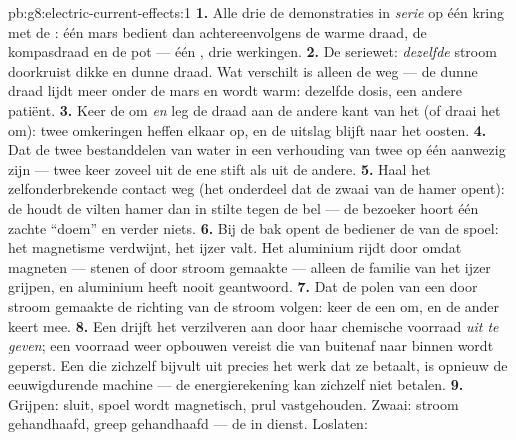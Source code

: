 \begin{solution}{pb:g8:electric-current-effects:1}
\textbf{1.} Alle drie de demonstraties in \emph{serie} op één kring met
de : één mars bedient dan achtereenvolgens de warme
draad, de kompasdraad en de pot --- één
, drie werkingen.
\textbf{2.} De seriewet: \emph{dezelfde} stroom doorkruist dikke en
dunne draad. Wat verschilt is alleen de weg --- de dunne draad lijdt
meer onder de mars en wordt warm: dezelfde dosis, een andere patiënt.
\textbf{3.} Keer de  om \emph{en} leg de draad aan de
andere kant van het  (of draai het  om):
twee omkeringen heffen elkaar op, en de uitslag blijft naar het oosten.
\textbf{4.} Dat de twee bestanddelen van water in een verhouding van
twee op één aanwezig zijn --- twee keer zoveel  uit de ene
stift als uit de andere.
\textbf{5.} Haal het zelfonderbrekende contact weg (het onderdeel dat
de zwaai van de hamer opent): de  houdt de vilten
hamer dan in stilte tegen de bel --- de bezoeker hoort één zachte
``doem'' en verder niets.
\textbf{6.} Bij de bak opent de bediener de  van de
spoel: het magnetisme verdwijnt, het ijzer valt. Het aluminium rijdt
door omdat magneten --- stenen of door stroom gemaakte --- alleen de
familie van het ijzer grijpen, en aluminium heeft nooit geantwoord.
\textbf{7.} Dat de polen van een door stroom gemaakte
 de richting van de stroom volgen: keer de een om, en de
ander keert mee.
\textbf{8.} Een  drijft het verzilveren aan door haar
chemische voorraad \emph{uit te geven}; een voorraad weer opbouwen
vereist  die van buitenaf naar binnen wordt geperst. Een
 die zichzelf bijvult uit precies het werk dat ze
betaalt, is opnieuw de eeuwigdurende machine --- de
energierekening kan zichzelf niet betalen.
\textbf{9.} Grijpen:  sluit, spoel wordt magnetisch,
prul vastgehouden. Zwaai: stroom gehandhaafd, greep gehandhaafd --- de
 in dienst. Loslaten:

\end{solution}
